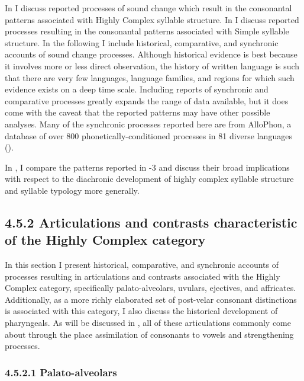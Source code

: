   In  I discuss reported processes of sound change which result in the consonantal patterns associated with Highly Complex syllable structure. In  I discuss reported processes resulting in the consonantal patterns associated with Simple syllable structure. In the following I include historical, comparative, and synchronic accounts of sound change processes. Although historical evidence is best because it involves more or less direct observation, the history of written language is such that there are very few languages, language families, and regions for which such evidence exists on a deep time scale. Including reports of synchronic and comparative processes greatly expands the range of data available, but it does come with the caveat that the reported patterns may have other possible analyses. Many of the synchronic processes reported here are from AlloPhon, a database of over 800 phonetically-conditioned processes in 81 diverse languages (\citealt{BybeeEasterday2019}).



  In , I compare the patterns reported in -3 and discuss their broad implications with respect to the diachronic development of highly complex syllable structure and syllable typology more generally.


\subsection{4.5.2 Articulations and contrasts characteristic of the Highly Complex category} 

  In this section I present historical, comparative, and synchronic accounts of processes resulting in articulations and contrasts associated with the Highly Complex category, specifically palato-alveolars, uvulars, ejectives, and affricates. Additionally, as a more richly elaborated set of post-velar consonant distinctions is associated with this category, I also discuss the historical development of pharyngeals. As will be discussed in , all of these articulations commonly come about through the place assimilation of consonants to vowels and strengthening processes.


\subsubsection{\textbf{4.5.2.1} \textbf{Palato-alveolars}}

